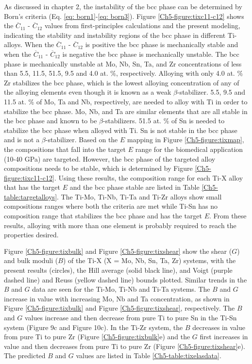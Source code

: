 As discussed in chapter 2, the instability of the bcc phase can be determined by Born's criteria (Eq. \ref{eq: born1}-\ref{eq: born3}). Figure \ref{Ch5-figure:tixc11-c12} shows the $\overline{C}_{11}$ - $\overline{C}_{12}$ values from first-principles calculations and the present modeling, indicating the stability and instability regions of the bcc phase in different Ti-alloys. When the $\overline{C}_{11}$ - $\overline{C}_{12}$ is positive the bcc phase is mechanically stable and when the $\overline{C}_{11}$ - $\overline{C}_{12}$ is negative the bcc phase is mechanically unstable. The bcc phase is mechanically unstable at Mo, Nb, Sn, Ta, and Zr concentrations of less than 5.5, 11.5, 51.5, 9.5 and 4.0 at. \%, respectively. Alloying with only 4.0 at. \% Zr stabilizes the bcc phase, which is the lowest alloying concentration of any of the alloying elements even though it is known as a weak $\beta$-stabilizer. 5.5, 9.5 and 11.5 at. \% of Mo, Ta and Nb, respectively, are needed to alloy with Ti in order to stabilize the bcc phase. Mo, Nb, and Ta are similar elements that are all stable in the bcc phase and known to be $\beta$-stabilizers. 51.5 at. \% of Sn is needed to stabilize the bcc phase when alloyed with Ti. Sn is not stable in the bcc phase and is not a $\beta$-stabilizer. Based on the $E$ mapping in Figure \ref{Ch5-figure:tixmap}, the compositions that fall into the target $E$ range for the biomedical application (10-40 GPa) are targeted. However, the bcc phase of the targeted alloy compositions needs to be stable, which is determined by Figure \ref{Ch5-figure:tixc11-c12}. Using these results, the composition range for each Ti-X alloy that has the target $E$ and the bcc phase stable are listed in Table \ref{Ch5-table:targetalloys}. The Ti-Mo, Ti-Nb, Ti-Ta and Ti-Zr alloys show small compositions ranges where both the criteria are met while Ti-Sn has no composition range that stabilizes the bcc phase and has the target $E$. From these results, alloying with more than one element is probably required to reach the properties desired. 

Figure \ref{Ch5-figure:tixbulk} and Figure \ref{Ch5-figure:tixshear} show the shear ($G$) and bulk moduli ($B$) of the Ti-X (X = Mo, Nb, Sn, Ta, Zr) systems, with the present results (circles), the Hill average (solid black line), and Voigt (purple dashed line) and Reuss (yellow dashed line) bounds plotted. Similar trends in the $B$ and $G$ data are seen for the Ti-Mo, Ti-Nb and Ti-Ta systems. The $B$ and $G$ increase in value with increasing Mo, Nb and Ta concentration, as shown in Figure \ref{Ch5-figure:tixbulk} and Figure \ref{Ch5-figure:tixshear}, respectively. The $B$ and $G$ values increase and then decrease from pure Ti to pure Sn in the Ti-Sn system (Figure 9c and Figure 10c). In the Ti-Zr system, the $B$ decreases in value from pure Ti to pure Zr (Figure \ref{Ch5-figure:tixbulk}e) and the $G$ first increases in value and then decreases from pure Ti to pure Zr (Figure \ref{Ch5-figure:tixshear}e). The predicted $B$ and $G$ values are listed in Table \ref{Ch5-table:tixelasdata}. 

